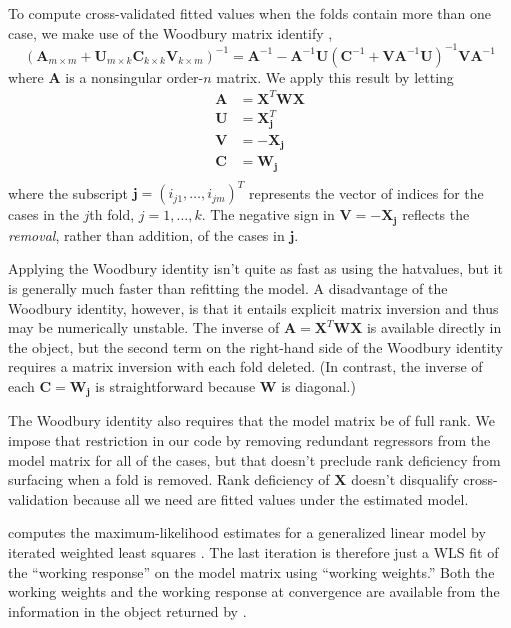 \documentclass[
]{jss}
\begin{document}
To compute cross-validated fitted values when the folds contain more
than one case, we make use of the Woodbury matrix identify
\citep{Wikipedia-Woodbury:2023}, \[
\left(\mathbf{A}_{m \times m} + \mathbf{U}_{m \times k} 
\mathbf{C}_{k \times k} \mathbf{V}_{k \times m} \right)^{-1} = \mathbf{A}^{-1} - \mathbf{A}^{-1}\mathbf{U} \left(\mathbf{C}^{-1} + 
\mathbf{VA}^{-1}\mathbf{U} \right)^{-1} \mathbf{VA}^{-1}
\] where \(\mathbf{A}\) is a nonsingular order-\(n\) matrix. We apply
this result by letting \begin{align*}
    \mathbf{A} &= \mathbf{X}^T \mathbf{W} \mathbf{X} \\
    \mathbf{U} &= \mathbf{X}_\mathbf{j}^T \\
    \mathbf{V} &= - \mathbf{X}_\mathbf{j} \\
    \mathbf{C} &= \mathbf{W}_\mathbf{j} \\
\end{align*} where the subscript
\(\mathbf{j} = (i_{j1}, \ldots, i_{jm})^T\) represents the vector of
indices for the cases in the \(j\)th fold, \(j = 1, \ldots, k\). The
negative sign in \(\mathbf{V} = - \mathbf{X}_\mathbf{j}\) reflects the
\emph{removal}, rather than addition, of the cases in \(\mathbf{j}\).

Applying the Woodbury identity isn't quite as fast as using the
hatvalues, but it is generally much faster than refitting the model. A
disadvantage of the Woodbury identity, however, is that it entails
explicit matrix inversion and thus may be numerically unstable. The
inverse of \(\mathbf{A} = \mathbf{X}^T \mathbf{W} \mathbf{X}\) is
available directly in the  object, but the second term on the
right-hand side of the Woodbury identity requires a matrix inversion
with each fold deleted. (In contrast, the inverse of each
\(\mathbf{C} = \mathbf{W}_\mathbf{j}\) is straightforward because
\(\mathbf{W}\) is diagonal.)

The Woodbury identity also requires that the model matrix be of full
rank. We impose that restriction in our code by removing redundant
regressors from the model matrix for all of the cases, but that doesn't
preclude rank deficiency from surfacing when a fold is removed. Rank
deficiency of \(\mathbf{X}\) doesn't disqualify cross-validation because
all we need are fitted values under the estimated model.

 computes the maximum-likelihood estimates for a generalized
linear model by iterated weighted least squares \citep[see, e.g.,][Sec.
6.12]{FoxWeisberg:2019}. The last iteration is therefore just a WLS fit
of the ``working response'' on the model matrix using ``working
weights.'' Both the working weights and the working response at
convergence are available from the information in the object returned by
.
\end{document}
